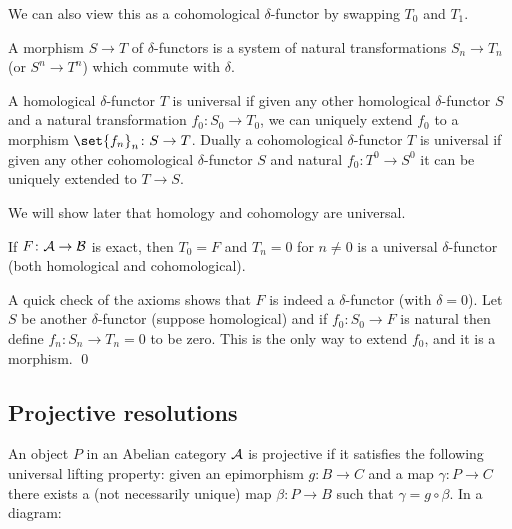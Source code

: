     We can also view this as a cohomological $\delta$-functor by swapping $T_0$ and $T_1$.

\eexam

\bdefn

    A morphism $S\to T$ of $\delta$-functors is a system of natural transformations $S_n\to T_n$ (or $S^n\to T^n$) which commute with $\delta$.

    A homological $\delta$-functor $T$ is {\emphcolor universal} if given any other homological $\delta$-functor $S$ and a natural transformation $f_0\colon S_0\to T_0$,
    we can uniquely extend $f_0$ to a morphism $\set{f_n}_n\colon S\to T$.
    Dually a cohomological $\delta$-functor $T$ is {\emphcolor universal} if given any other cohomological $\delta$-functor $S$ and natural $f_0\colon T^0\to S^0$ it can be uniquely
    extended to $T\to S$.

\edefn

\bexam

    We will show later that homology and cohomology are universal.

\eexam

\bprop

    If $F\colon{{\cal A}}\to{{\cal B}}$ is exact, then $T_0=F$ and $T_n=0$ for $n\neq0$ is a universal $\delta$-functor (both homological and cohomological).

\eprop

\bproof

    A quick check of the axioms shows that $F$ is indeed a $\delta$-functor (with $\delta=0$).
    Let $S$ be another $\delta$-functor (suppose homological) and if $f_0\colon S_0\to F$ is natural then define $f_n\colon S_n\to T_n=0$ to be zero.
    This is the only way to extend $f_0$, and it is a morphism.
    \qed

\eproof

\subsection{Projective resolutions}

\bdefn

    An object $P$ in an Abelian category ${{\cal A}}$ is {\emphcolor projective} if it satisfies the following universal lifting property: given an epimorphism $g\colon B\to C$
    and a map $\gamma\colon P\to C$ there exists a (not necessarily unique) map $\beta\colon P\to B$ such that $\gamma=g\circ\beta$.
    In a diagram:

    \centerline{}

